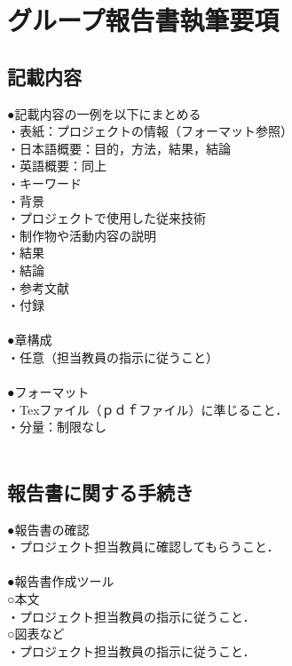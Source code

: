 \chapter{グループ報告書執筆要項}
\section{記載内容}
\noindent
●記載内容の一例を以下にまとめる\\
・表紙：プロジェクトの情報（フォーマット参照）\\
・日本語概要：目的，方法，結果，結論\\
・英語概要：同上\\
・キーワード\\
・背景\\
・プロジェクトで使用した従来技術\\
・制作物や活動内容の説明\\
・結果\\
・結論\\
・参考文献\\
・付録\\
\\
●章構成\\
・任意（担当教員の指示に従うこと）\\
\\
●フォーマット\\
・Texファイル（ｐｄｆファイル）に準じること．\\
・分量：制限なし\\
\\
\section{報告書に関する手続き}
\noindent
●報告書の確認\\
・プロジェクト担当教員に確認してもらうこと．\\
\\
●報告書作成ツール\\
○本文\\
・プロジェクト担当教員の指示に従うこと．\\
○図表など\\
・プロジェクト担当教員の指示に従うこと．\\
\\
